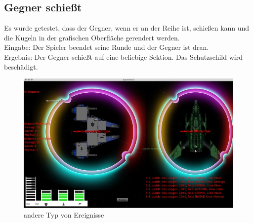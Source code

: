 \documentclass[12pt]{article}
\begin{document}
\subsection{Gegner schießt}
Es wurde getestet, dass der Gegner, wenn er an der Reihe ist, schießen kann und die Kugeln in der grafischen Oberfläche gerendert werden.\\
Eingabe: Der Spieler beendet seine Runde und der Gegner ist dran.\\
Ergebnis: Der Gegner schießt auf eine beliebige Sektion. Das Schutzschild wird beschädigt.\\
\begin{figure}[htp]
\centering
\includegraphics[scale=0.7]{TestProtocolBilder/OptimizedgegnerShots.png}
\caption{andere Typ von Ereignisse}
\end{figure}


\newpage
\end{document}

